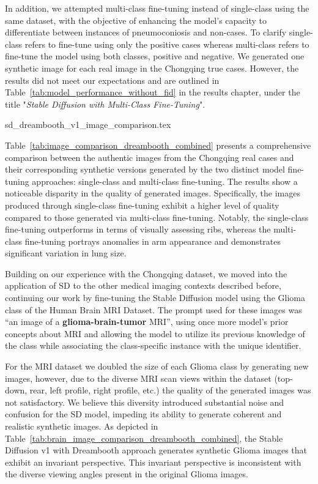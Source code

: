 In addition, we attempted multi-class fine-tuning instead of single-class using the same dataset, with the objective of enhancing the model's capacity to differentiate between instances of pneumoconiosis and non-cases. To clarify single-class refers to fine-tune using only the positive cases whereas multi-class refers to fine-tune the model using both classes, positive and negative. We generated one synthetic image for each real image in the Chongqing true cases. However, the results did not meet our expectations and are outlined in Table~\ref{tab:model_performance_without_fid} in the results chapter, under the title "\textit{Stable Diffusion with Multi-Class Fine-Tuning}".

{sd_dreambooth_v1_image_comparison.tex}

Table~\ref{tab:image_comparison_dreambooth_combined} presents a comprehensive comparison between the authentic images from the Chongqing real cases and their corresponding synthetic versions generated by the two distinct model fine-tuning approaches: single-class and multi-class fine-tuning. The results show a noticeable disparity in the quality of generated images. Specifically, the images produced through single-class fine-tuning exhibit a higher level of quality compared to those generated via multi-class fine-tuning. Notably, the single-class fine-tuning outperforms in terms of visually assessing ribs, whereas the multi-class fine-tuning portrays anomalies in arm appearance and demonstrates significant variation in lung size.

Building on our experience with the Chongqing dataset, we moved into the application of SD to the other medical imaging contexts described before, continuing our work by fine-tuning the Stable Diffusion model using the Glioma class of the Human Brain MRI Dataset. The prompt used for these images was ``an image of a \textbf{glioma-brain-tumor} MRI'', using once more model's prior concepts about MRI and allowing the model to utilize its previous knowledge of the class while associating the class-specific instance with the unique identifier. 

For the MRI dataset we doubled the size of each Glioma class by generating new images, however, due to the diverse MRI scan views within the dataset (top-down, rear, left profile, right profile, etc.) the quality of the generated images was not satisfactory. We believe this diversity introduced substantial noise and confusion for the SD model, impeding its ability to generate coherent and realistic synthetic images.  As depicted in Table~\ref{tab:brain_image_comparison_dreambooth_combined}, the Stable Diffusion v1 with Dreambooth approach generates synthetic Glioma images that exhibit an invariant perspective. This invariant perspective is inconsistent with the diverse viewing angles present in the original Glioma images. 

